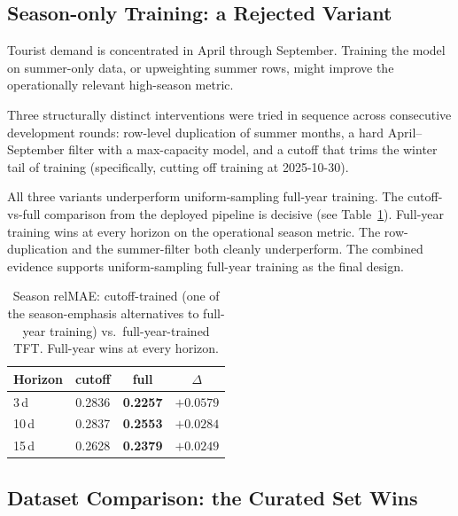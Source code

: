 \documentclass[twocolumn,twoside,a4paper,10pt]{IEEEtran}
\begin{document}
\subsection{Season-only Training: a Rejected Variant}

Tourist demand is concentrated in April through September. Training the model on summer-only data, or upweighting summer rows, might improve the operationally relevant high-season metric.

Three structurally distinct interventions were tried in sequence across consecutive development rounds: row-level duplication of summer months, a hard April--September filter with a max-capacity model, and a cutoff that trims the winter tail of training (specifically, cutting off training at 2025-10-30).

All three variants underperform uniform-sampling full-year training. The cutoff-vs-full comparison from the deployed pipeline is decisive (see Table~\ref{tab:cutoff_vs_full}). Full-year training wins at every horizon on the operational season metric. The row-duplication and the summer-filter both cleanly underperform. The combined evidence supports uniform-sampling full-year training as the final design.

\begin{table}[!ht]
    \caption{Season relMAE: cutoff-trained (one of the season-emphasis alternatives to full-year training) vs.\ full-year-trained TFT. Full-year wins at every horizon.}
    \label{tab:cutoff_vs_full}
    \begin{center}
    \begin{tabular}{lccc}
        \toprule
        Horizon & cutoff & full & $\Delta$ \\
        \midrule
         3\,d  & 0.2836 & \textbf{0.2257} & $+0.0579$ \\
        10\,d  & 0.2837 & \textbf{0.2553} & $+0.0284$ \\
        15\,d  & 0.2628 & \textbf{0.2379} & $+0.0249$ \\
        \bottomrule
    \end{tabular}
    \end{center}
\end{table}

\subsection{Dataset Comparison: the Curated Set Wins}
\end{document}
